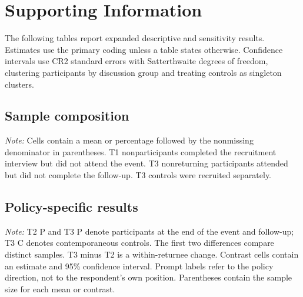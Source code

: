 \documentclass{article}
\begin{document}
\section*{Supporting Information}

The following tables report expanded descriptive and sensitivity results. Estimates use the
primary coding unless a table states otherwise. Confidence intervals use CR2 standard errors
with Satterthwaite degrees of freedom, clustering participants by discussion group and treating
controls as singleton clusters.

\subsection{Sample composition}

\begin{table}[H]
\centering
\caption{Composition of recruitment, participant, returnee, and control samples}

\begin{minipage}{0.95\textwidth}
\smallskip\footnotesize
\textit{Note:} Cells contain a mean or percentage followed by the nonmissing denominator in
parentheses. T1 nonparticipants completed the recruitment interview but did not attend the
event. T3 nonreturning participants attended but did not complete the follow-up. T3 controls
were recruited separately.
\end{minipage}
\end{table}

\clearpage
\begin{landscape}
\subsection{Policy-specific results}

\begin{table}[H]
\centering
\scriptsize
\caption{Mean coded reasons and contrasts by policy and prompt}
\resizebox{\linewidth}{!}{%

}
\begin{minipage}{0.96\linewidth}
\smallskip\footnotesize
\textit{Note:} T2 P and T3 P denote participants at the end of the event and follow-up; T3 C
denotes contemporaneous controls. The first two differences compare distinct samples. T3
minus T2 is a within-returnee change. Contrast cells contain an estimate and 95\% confidence
interval. Prompt labels refer to the policy direction, not to the respondent's own position.
Parentheses contain the sample size for each mean or contrast.
\end{minipage}
\end{table}
\end{landscape}
\end{document}
